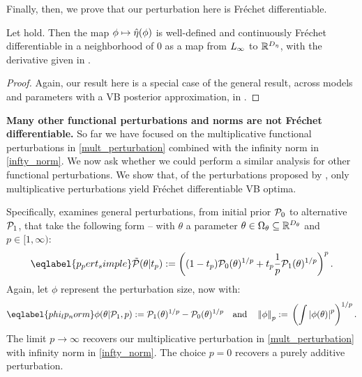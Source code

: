 Finally, then, we prove that our perturbation here is Fr{\'e}chet differentiable.
\begin{thm}
%
Let  hold.
%
%
Then the map $\phi \mapsto \hat\eta(\phi)$ is well-defined and continuously
Fr{\'e}chet differentiable in a neighborhood of $0$ as a map from ${L_{\infty}}$ to
$\mathbb{R}^{D_{\eta}}$, with the derivative given in .
\end{thm}
%
\begin{proof}
%
Again, our result here is a special case of the general result, across models
and parameters with a VB posterior approximation, in .
%
\end{proof}

\noindent \textbf{Many other functional perturbations and norms are not Fr{\'e}chet differentiable.}
%
So far we have focused on the multiplicative functional perturbations in
\eqref{mult_perturbation} combined with the infinity norm in \eqref{infty_norm}.
We now ask whether we could perform a similar analysis for other functional
perturbations. We show that, of the perturbations proposed by
\citet{gustafson:1996:local}, only multiplicative perturbations yield
Fr{\'e}chet differentiable VB optima.

Specifically, \citet{gustafson:1996:local} examines general perturbations, from
initial prior $\mathcal{P}_{0}$ to alternative $\mathcal{P}_{1}$, that take the following form --
with $\theta$ a parameter $\theta \in \Omega_{\theta} \subseteq
\mathbb{R}^{{D_{\theta}}}$ and $p \in [1, \infty)$:
%
\begin{align}\eqlabel{p_pert_simple}
%
\ptil(\theta \vert \tp) :=
    \left((1 - \tp)\pbase(\theta)^{1/p} +
    \tp \frac{1}{p}\palt(\theta)^{1/p} \right)^{p}.
%
\end{align}
%
Again, let $\phi$ represent the perturbation size, now with:
%
\begin{align}\eqlabel{phi_lp_norm}
%
\phi(\theta \vert \palt, p) :={}
    \palt(\theta)^{1/p} - \pbase(\theta)^{1/p} \mathand
\norm{\phi}_p :={} \left(\int \abs{\phi(\theta)}^p \right)^{1/p}.
%
\end{align}
%
The limit $p \rightarrow \infty$ recovers our multiplicative perturbation in
\eqref{mult_perturbation} with infinity norm in \eqref{infty_norm}. The choice
$p=0$ recovers a purely additive perturbation.

